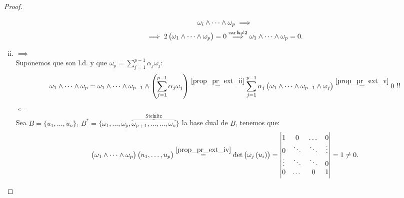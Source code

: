 \begin{proof}
\begin{enumerate}[i)]
\begin{gather*}
        \omega_i \wedge \dots \wedge \omega_p \implies \\
        \implies 2\left( \omega_1 \wedge \dots \wedge \omega_p \right) = 0
        \stackrel{\operatorname{car} \mathbf{k} \neq 2}{\implies} \omega_1 \wedge \dots \wedge \omega_p = 0.
        \end{gather*}
        \item $\implies$ \\
        Suponemos que son l.d. y que $\omega_p = \sum_{j=1}^{p-1} \alpha_j \omega_j$:
        \[
        \omega_1 \wedge \dots \wedge \omega_p = \omega_1 \wedge \dots \wedge \omega_{p-1} \wedge \left(
        \sum_{j=1}^{p-1} \alpha_j \omega_j \right) \stackrel{\ref{prop_pr_ext_ii}}{=} \sum_{j=1}^{p-1}
        \alpha_j \left( \omega_1 \wedge \dots \wedge \omega_{p-1} \wedge \omega_j \right)
        \stackrel{\ref{prop_pr_ext_v}}{=} 0 \text{ } !!
        \]
        $\impliedby$ \\
        Sea $B=\{u_1,\dots,u_n\}$, $B^*=\{\omega_1, \dots, \omega_p,\overbrace{\omega_{p+1},\dots, \dots,
		    \omega_n}^{\text{Steinitz}} \}$ la base dual de $B$, tenemos que:
        \[
        \left( \omega_1 \wedge \dots \wedge \omega_p \right) \left( u_1,\dots,u_p \right) \stackrel{\ref{prop_pr_ext_iv}}{=}
        \det\left( \omega_j \left(u_i \right) \right) =
        \begin{vmatrix}
            1 & 0 & \dots & 0 \\
            0 & \ddots & \ddots & \vdots \\
            \vdots & \ddots & \ddots & 0 \\
            0 & \dots & 0 & 1
        \end{vmatrix}
        = 1 \neq 0.
        \]
    \end{enumerate}
\end{proof}



